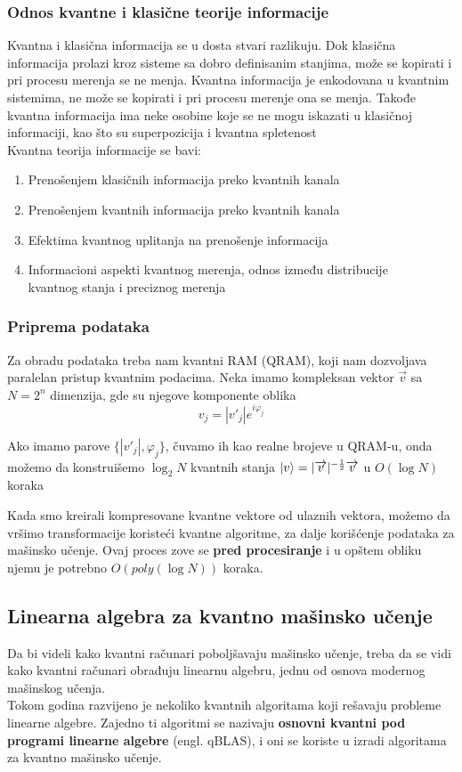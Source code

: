 \documentclass[12pt, letterpaper, oneside]{article}
\begin{document}
\subsubsection*{Odnos kvantne i klasične teorije informacije}
Kvantna i klasična informacija se u dosta stvari razlikuju. Dok klasična informacija prolazi kroz sisteme sa dobro definisanim stanjima, može se kopirati i pri procesu merenja se ne menja.
Kvantna informacija je enkodovana u kvantnim sistemima, ne može se kopirati i pri procesu merenje ona se menja. Takođe kvantna informacija ima neke osobine koje se ne
mogu iskazati u klasičnoj informaciji, kao što su superpozicija i kvantna spletenost \cite{Classical&quantum_info} \\
Kvantna teorija informacije se bavi: 
\begin{enumerate}
    \item Prenošenjem klasičnih informacija preko kvantnih kanala
    \item Prenošenjem kvantnih informacija preko kvantnih kanala
    \item Efektima kvantnog uplitanja na prenošenje informacija
    \item Informacioni aspekti kvantnog merenja, odnos između distribucije \\
    kvantnog stanja i preciznog merenja
\end{enumerate}
\subsubsection{Priprema podataka}
Za obradu podataka treba nam kvantni RAM (QRAM), koji nam dozvoljava paralelan pristup kvantnim podacima.
Neka imamo kompleksan vektor $\overrightarrow{v}$ sa $N=2^n$ dimenzija, gde su njegove komponente oblika 
\[
    v_j = |v'_j|e^{i\varphi_j}
\]

Ako imamo parove $\{|v'_j|,\varphi_j\}$, čuvamo ih kao realne brojeve u QRAM-u, onda možemo da konstruišemo
$\log_{2}N$ kvantnih stanja $\ket{v} = |\overrightarrow{v}|^{-\frac{1}{2}}\overrightarrow{v}$ u $O(\log N)$ koraka

Kada smo kreirali kompresovane kvantne vektore od ulaznih vektora, možemo da vršimo transformacije koristeći kvantne algoritme, za dalje korišćenje podataka za mašinsko učenje.
Ovaj proces zove se \textbf{pred procesiranje} i u opštem obliku njemu je potrebno $O(poly(\log{}N))$ koraka. \cite{lloyd2013quantum}

\subsection{Linearna algebra za kvantno mašinsko učenje}
Da bi videli kako kvantni računari poboljšavaju mašinsko učenje, treba da se vidi kako kvantni računari obrađuju linearnu algebru, jednu od osnova modernog mašinskog učenja. \\
Tokom godina razvijeno je nekoliko kvantnih algoritama koji rešavaju probleme linearne algebre.
Zajedno ti algoritmi se nazivaju \textbf{osnovni kvantni pod programi linearne algebre} (engl. qBLAS), i oni se koriste u izradi algoritama za kvantno mašinsko učenje.
\end{document}
